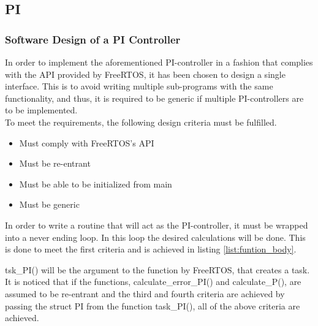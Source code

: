 \documentclass[../../../main]{subfiles}
\begin{document}
\lstset{basicstyle=\tt\scriptsize}


\subsection{PI}

\subsubsection{Software Design of a PI Controller}
In order to implement the aforementioned PI-controller in a fashion that complies with the API provided by FreeRTOS, it has been chosen to design a single interface.
This is to avoid writing multiple sub-programs with the same functionality, and thus, it is required to be generic if multiple PI-controllers are to be implemented.
\\

To meet the requirements, the following design criteria must be fulfilled.

\begin{itemize}
  \item Must comply with FreeRTOS's API
  \item Must be re-entrant
  \item Must be able to be initialized from main
  \item Must be generic
\end{itemize}

In order to write a routine that will act as the PI-controller, it must be wrapped into a never ending loop.
In this loop the desired calculations will be done. This is done to meet the first criteria and is achieved in listing \ref{list:funtion_body}.





tsk\_PI() will be the argument to the function by FreeRTOS, that creates a task.
It is noticed that if the functions, calculate\_error\_PI() and calculate\_P(), are assumed to be re-entrant and the third and fourth criteria are achieved by passing the struct PI from the function task\_PI(), all of the above criteria are achieved.
\\
\end{document}
